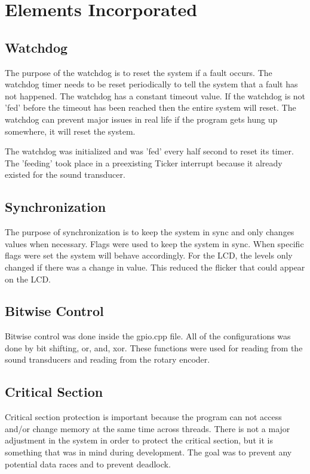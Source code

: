 \documentclass{article}
\begin{document}
\section{Elements Incorporated}
\subsection{Watchdog}
The purpose of the watchdog is to reset the system if a fault occurs.
The watchdog timer needs to be reset periodically to tell the system that a fault has not happened. The watchdog has a constant timeout value.  If the watchdog is not 'fed' before the timeout has been reached then the entire system will reset.  The watchdog can prevent major issues in real life if the program gets hung up somewhere, it will reset the system.

The watchdog was initialized and was 'fed' every half second to reset its timer.  The 'feeding' took place in a preexisting Ticker interrupt because it already existed for the sound transducer. 

\subsection{Synchronization}
The purpose of synchronization is to keep the system in sync and only changes values when necessary.
Flags were used to keep the system in sync.  When specific flags were set the system will behave accordingly.  For the LCD, the levels only changed if there was a change in value.  This reduced the flicker that could appear on the LCD.

\subsection{Bitwise Control}
Bitwise control was done inside the gpio.cpp file.  All of the configurations was done by bit shifting, or, and, xor.  These functions were used for reading from the sound transducers and reading from the rotary encoder.

\subsection{Critical Section}
Critical section protection is important because the program can not access and/or change memory at the same time across threads.  There is not a major adjustment in the system in order to protect the critical section, but it is something that was in mind during development.  The goal was to prevent any potential data races and to prevent deadlock. 
\end{document}
